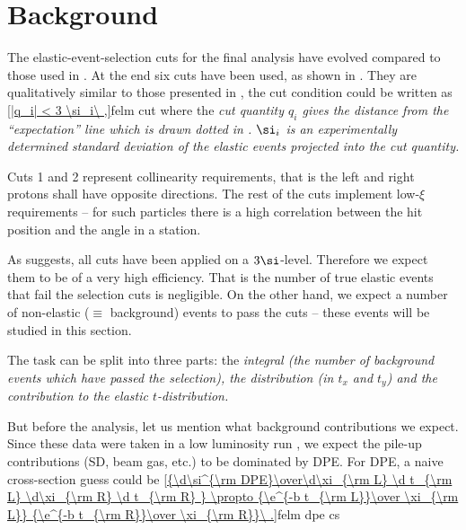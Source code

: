 \section[felm bckg]{Background}

The elastic-event-selection cuts for the final analysis have evolved compared to those used in . At the end six cuts have been used, as shown in . They are qualitatively similar to those presented in , the cut condition could be written as
\eqref{|q_i| < 3 \si_i\ ,}{felm cut}
where the \em{cut quantity} $q_i$ gives the distance from the ``expectation'' line which is drawn dotted in . $\si_i$ is an experimentally determined standard deviation of the elastic events projected into the cut quantity.

Cuts 1 and 2 represent collinearity requirements, that is the left and right protons shall have opposite directions. The rest of the cuts implement low-$\xi$ requirements -- for such particles there is a high correlation between the hit position and the angle in a station.


As  suggests, all cuts have been applied on a $3\si$-level. Therefore we expect them to be of a very high efficiency. That is the number of true elastic events that fail the selection cuts is negligible. On the other hand, we expect a number of non-elastic ($\equiv$ background) events to pass the cuts -- these events will be studied in this section.

The task can be split into three parts: the \em{integral} (the number of background events which have passed the selection), the \em{distribution} (in $t_x$ and $t_y$) and the \em{contribution to the elastic $t$-distribution}.

But before the analysis, let us mention what background contributions we expect. Since these data were taken in a low luminosity run
, we expect the pile-up contributions (SD, beam gas, etc.) to be dominated by DPE. For DPE, a naive cross-section guess could be
\eqref{{\d\si^{\rm DPE}\over\d\xi_{\rm L} \d t_{\rm L} \d\xi_{\rm R} \d t_{\rm R} } \propto {\e^{-b t_{\rm L}}\over \xi_{\rm L}} {\e^{-b t_{\rm R}}\over \xi_{\rm R}}\ .}{felm dpe cs}

